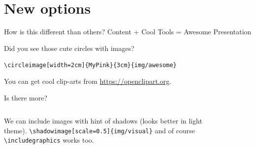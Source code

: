 \documentclass[xetex, aspectratio=169]{beamer}
\begin{document}
\section{New options}

\begin{frame}[fragile]{How is this different than others?}
\centering
	\alert{Content + Cool Tools = Awesome Presentation}\vspace*{\baselineskip}
	
		Did you see those cute circles with images?

\verb|\circleimage[width=2cm]{MyPink}{3cm}{img/awesome}| \vspace*{\baselineskip}


		
		You can get cool clip-arts from \url{https://openclipart.org}.

	
\end{frame}


\begin{frame}[fragile]{Is there more?}
	
\begin{columns}
	\centering
	We can include images with hint of shadows (looks better in light theme).
\verb|\shadowimage[scale=0.5]{img/visual}|
and of course \verb|\includegraphics| works too. 

	\centering
	\begin{figure}
	\end{figure}
\end{columns}

\end{frame}
\end{document}

